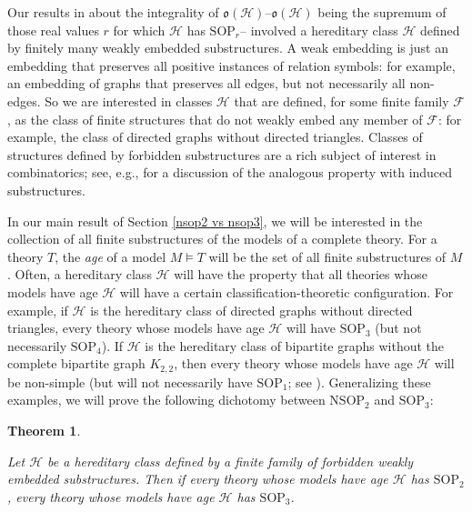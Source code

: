 \documentclass{amsart}
\newtheorem{theorem}{Theorem}[section]
\theoremstyle{definition}
\theoremstyle{remark}
\numberwithin{equation}{section}
\begin{document}
Our results in \cite{ApproxOrder} about the integrality of $\mathfrak{o}(\mathcal{H})$--$\mathfrak{o}(\mathcal{H})$ being the supremum of those real values $r$ for which $\mathcal{H}$ has $\mathrm{SOP}_{r}$-- involved a hereditary class $\mathcal{H}$ defined by finitely many weakly embedded substructures. A weak embedding is just an embedding that preserves all positive instances of relation symbols: for example, an embedding of graphs that preserves all edges, but not necessarily all non-edges. So we are interested in classes $\mathcal{H}$ that are defined, for some finite family $\mathcal{F}$, as the class of finite structures that do not weakly embed any member of $\mathcal{F}$: for example, the class of directed graphs without directed triangles. Classes of structures defined by forbidden substructures are a rich subject of interest in combinatorics; see, e.g., \cite{LZ17} for a discussion of the analogous property with induced substructures.


In our main result of Section \ref{nsop2 vs nsop3}, we will be interested in the collection of all finite substructures of the models of a complete theory. For a  theory $T$, the \textit{age} of a model $M \models T$ will be the set of all finite substructures of $M$. Often, a hereditary class $\mathcal{H}$ will have the property that all theories whose models have age $\mathcal{H}$ will have a certain classification-theoretic configuration. For example, if $\mathcal{H}$ is the hereditary class of directed graphs without directed triangles, every theory whose models have age $\mathcal{H}$ will have $\mathrm{SOP}_{3}$ (but not necessarily $\mathrm{SOP}_{4}$). If $\mathcal{H}$ is the hereditary class of bipartite graphs without the complete bipartite graph $K_{2, 2}$, then every theory whose models have age $\mathcal{H}$ will be non-simple (but will not necessarily have $\mathrm{SOP}_{1}$; see \cite{CoK19}). Generalizing these examples, we will prove the following dichotomy between $\mathrm{NSOP}_{2}$ and $\mathrm{SOP}_{3}$:

\begin{theorem}\label{main theorem 3}

Let $\mathcal{H}$ be a hereditary class defined by a finite family of forbidden weakly embedded substructures. Then if every theory whose models have age $\mathcal{H}$ has $\mathrm{SOP}_{2}$, every theory whose models have age $\mathcal{H}$ has $\mathrm{SOP}_{3}$.


\end{theorem}
\end{document}
